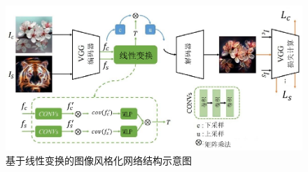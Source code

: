 \begin{figure}[htb]
    \centering
    \includegraphics[width=.8\linewidth]{images/chapter2/linear.pdf}
    \caption[基于线性变换的图像风格化网络结构示意图]{基于线性变换的图像风格化网络结构示意图~\cite{Li_2019_CVPR}}
    \label{fig:linear}
\end{figure}
